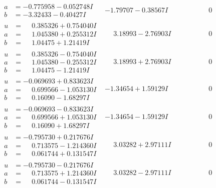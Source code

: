 \documentclass[1p]{elsarticle_modified}
\theoremstyle{definition}
\begin{document}
$$\begin{array}{c|c|c}
\begin{aligned}
a &= -0.775958 - 0.052748 I \\
b &= -3.32433 - 0.40427 I\end{aligned}
 & -1.79707 - 0.38567 I & \phantom{-0.000000 } 0 \\ \hline\begin{aligned}
u &= \phantom{-}0.385326 + 0.754040 I \\
a &= \phantom{-}1.045380 + 0.255312 I \\
b &= \phantom{-}1.04475 + 1.21419 I\end{aligned}
 & \phantom{-}3.18993 - 2.76903 I & \phantom{-0.000000 } 0 \\ \hline\begin{aligned}
u &= \phantom{-}0.385326 - 0.754040 I \\
a &= \phantom{-}1.045380 - 0.255312 I \\
b &= \phantom{-}1.04475 - 1.21419 I\end{aligned}
 & \phantom{-}3.18993 + 2.76903 I & \phantom{-0.000000 } 0 \\ \hline\begin{aligned}
u &= -0.069693 + 0.833623 I \\
a &= \phantom{-}0.699566 - 1.053130 I \\
b &= \phantom{-}0.16090 - 1.68297 I\end{aligned}
 & -1.34654 + 1.59129 I & \phantom{-0.000000 } 0 \\ \hline\begin{aligned}
u &= -0.069693 - 0.833623 I \\
a &= \phantom{-}0.699566 + 1.053130 I \\
b &= \phantom{-}0.16090 + 1.68297 I\end{aligned}
 & -1.34654 - 1.59129 I & \phantom{-0.000000 } 0 \\ \hline\begin{aligned}
u &= -0.795730 + 0.217676 I \\
a &= \phantom{-}0.713575 - 1.214360 I \\
b &= \phantom{-}0.061744 + 0.131547 I\end{aligned}
 & \phantom{-}3.03282 + 2.97111 I & \phantom{-0.000000 } 0 \\ \hline\begin{aligned}
u &= -0.795730 - 0.217676 I \\
a &= \phantom{-}0.713575 + 1.214360 I \\
b &= \phantom{-}0.061744 - 0.131547 I\end{aligned}
 & \phantom{-}3.03282 - 2.97111 I & \phantom{-0.000000 } 0 \\ \hline\begin{aligned}

\end{aligned}
\end{array}$$
\end{document}
